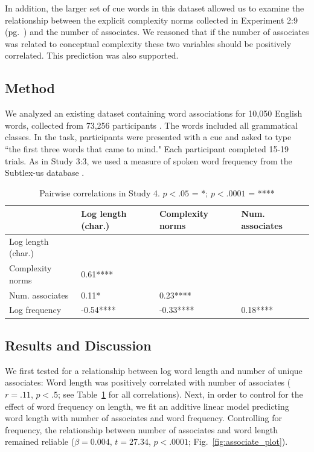 In addition, the larger set of cue words in this dataset allowed us to  examine the relationship between the explicit complexity norms collected in  Experiment 2:9 (pg.\ \pageref{ch2-9}) and the number of associates. We reasoned that if the number of associates was related to conceptual complexity these two variables should be positively correlated. This prediction was also supported.

\subsection{Method}
We analyzed an existing dataset containing word associations for  10,050 English words, collected from 73,256 participants \cite{de2013better}. The words included all grammatical classes. In the task, participants were presented with a cue and  asked to type ``the first  three words that came to mind." Each participant completed 15-19 trials. As in Study 3:3, we used a measure of spoken word frequency from the Subtlex-us database \cite{brysbaert2009moving}. 


\begin{table}[t!]
\centering
\begin{tabular}{llll}
  \hline
 & Log length (char.)  & Complexity norms &   Num. associates  \\ 
  \hline
Log length (char.) &  &  &  \\ 
Complexity norms  &  0.61**** &  &  \\ 
Num. associates &  0.11*    &  0.23**** &  \\ 
Log frequency& -0.54**** & -0.33**** &  0.18**** \\ 
   \hline
\end{tabular}
\caption{Pairwise correlations in Study 4. $p<.05$ = *; $p<.0001$ = ****}
\label{study4corr}
\end{table}

\subsection{Results and Discussion}

We first tested for a relationship between log word length and number of unique associates: Word length was positively correlated with number of associates ($r = .11$, $p< .5$; see Table~\ref{study4corr} for all correlations).  Next, in order to control for the effect of word frequency on length, we fit an additive linear model predicting word length with number of associates and word frequency. Controlling for frequency, the relationship between number of associates and word length remained reliable ($\beta=0.004$, $t =27.34$, $p<.0001$; Fig.\ \ref{fig:associate_plot}).

